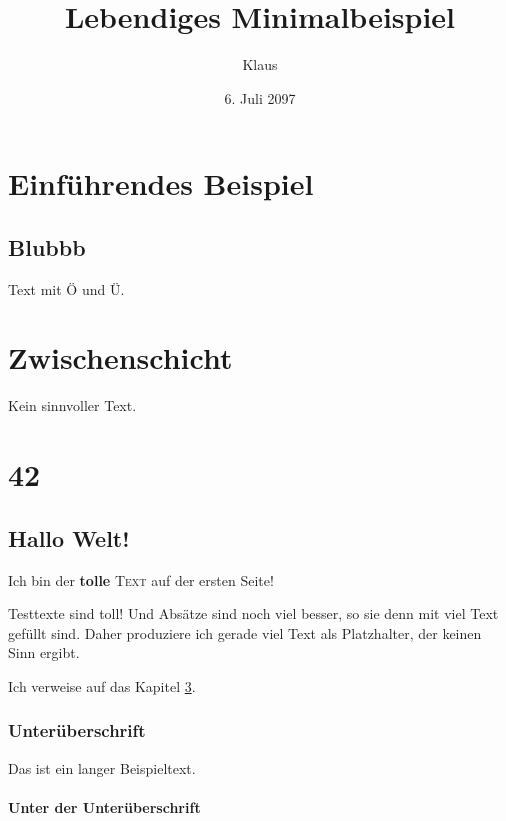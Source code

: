 \documentclass[]{scrreprt}
\author{Klaus}
\title{Lebendiges Minimalbeispiel}
\date{6. Juli 2097}
\begin{document}
\maketitle %

\tableofcontents %

\listoffigures %

\chapter{Einführendes Beispiel}

\section{Blubbb}

Text mit Ö und Ü.

\chapter{Zwischenschicht}

Kein sinnvoller Text.


\chapter{42}
\label{ch:42}



\section{Hallo Welt!}
\tiny
Ich bin der \textbf{tolle} \textsc{Text} auf der ersten Seite! 
\normalsize

Testtexte sind toll! Und Absätze sind noch viel besser, so sie denn mit viel Text gefüllt sind. Daher produziere ich gerade viel Text als Platzhalter, der keinen Sinn ergibt.

Ich verweise auf das Kapitel \ref{ch:42}.

\subsection{Unterüberschrift}

Das ist ein langer Beispieltext.

\subsubsection{Unter der Unterüberschrift}
\end{document}
